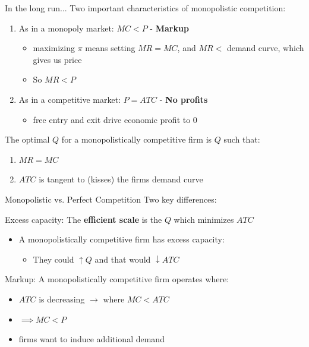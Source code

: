 \documentclass[compress]{beamer}
\begin{document}
\begin{frame}{In the long run...}
Two important characteristics of monopolistic competition:
    \begin{enumerate}
        \item As in a monopoly market: $MC < P$ - \textbf{Markup}
        \begin{itemize}
            \item maximizing $\pi$ means setting $MR = MC$, and $MR < $ demand curve, which gives us price
            \item So $MR < P$
        \end{itemize}
    \item As in a competitive market: $P = ATC$ - \textbf{No profits}
    \begin{itemize}
        \item free entry and exit drive economic profit to 0
    \end{itemize}
    \end{enumerate}
\vspace{3mm}
    The optimal $Q$ for a monopolistically competitive firm is $Q$ such that:
    \begin{enumerate}
        \item $MR = MC$
        \item $ATC$ is tangent to (kisses) the firms demand curve
    \end{enumerate}
\end{frame}

\begin{frame}{Monopolistic vs. Perfect Competition}
    Two key differences:
    \begin{block}{Excess capacity:}
        The \textbf{efficient scale} is the $Q$ which minimizes $ATC$
        \begin{itemize}
            \item A monopolistically competitive firm has excess capacity:
            \begin{itemize}
                \item They could $\uparrow Q$ and that would $\downarrow ATC$
            \end{itemize}
        \end{itemize}
    \end{block}

    \begin{block}{Markup:}
        A monopolistically competitive firm operates where:
        \begin{itemize}
            \item $ATC$ is decreasing $\to$ where $MC < ATC$
            \item $\implies MC < P$
            \item firms want to induce additional demand
        \end{itemize}
    \end{block}
\end{frame}
\end{document}
